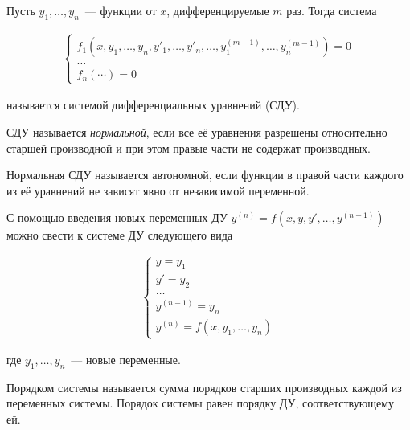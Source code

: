 
\begin{definition}
  Пусть \(y_{1}, \dots, y_{n}\)~--- функции от \(x\), дифференцируемые \(m\)
  раз. Тогда система

  \begin{align*}
    \begin{cases}
      f_{1}(x,
        y_{1}, \dotsc, y_{n},
        y'_{1}, \dotsc, y'_{n},
        \dotsc,
        y_{1}^{(m - 1)}, \dotsc, y_{n}^{(m - 1)}
      ) = 0 \\
      \dotsc \\
      f_{n} (\cdots) = 0
    \end{cases}
  \end{align*}

  называется системой дифференциальных уравнений (СДУ).
\end{definition}

\begin{definition}
  СДУ называется \textit{нормальной}, если все её уравнения разрешены
  относительно старшей производной и при этом правые части не содержат
  производных.
\end{definition}

\begin{definition}
  Нормальная СДУ называется автономной, если функции в правой части каждого из
  её уравнений не зависят явно от независимой переменной.
\end{definition}

\begin{remark}\label{de-to-sde}
  С помощью введения новых переменных ДУ
  \(y^{(n)} = f(x, y, y', \dotsc, y^{(n - 1)})\) можно свести к системе ДУ
  следующего вида

  \begin{align*}
    \begin{cases}
      y = y_{1} \\
      y' = y_{2} \\
      \dots \\
      y^{(n - 1)} = y_{n} \\
      y^{(n)} = f(x, y_{1}, \dotsc, y_{n})
    \end{cases}
  \end{align*}

  где \(y_{1}, \dotsc, y_{n}\)~--- новые переменные.
\end{remark}

\begin{definition}
  Порядком системы называется сумма порядков старших производных каждой из
  переменных системы. Порядок системы равен порядку ДУ, соответствующему ей.
\end{definition}

